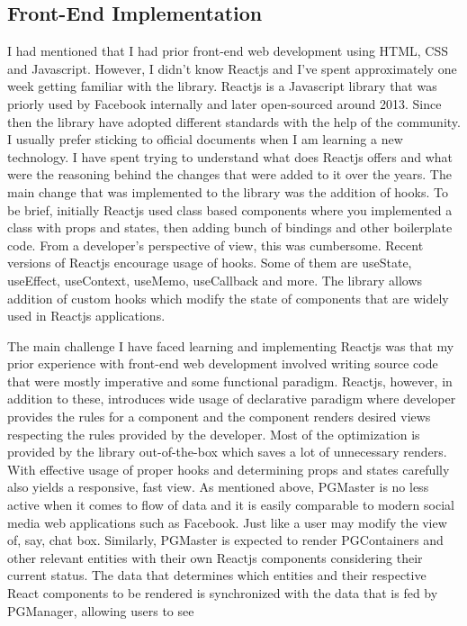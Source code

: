 \subsection{Front-End Implementation}
I had mentioned that I had prior front-end web development using HTML, CSS and 
Javascript. However, I didn't know Reactjs and I've spent approximately one 
week getting familiar with the library. Reactjs is a Javascript library 
that was priorly used by Facebook internally and later open-sourced around 
2013. Since then the library have adopted different standards with the help 
of the community. I usually prefer sticking to official documents when I 
am learning a new technology. I have spent trying to understand what does 
Reactjs offers and what were the reasoning behind the changes that were 
added to it over the years. The main change that was implemented to the 
library was the addition of hooks. To be brief, initially Reactjs used 
class based components where you implemented a class with props and states, 
then adding bunch of bindings and other boilerplate code. From a developer's 
perspective of view, this was cumbersome. Recent versions of Reactjs 
encourage usage of hooks. Some of them are useState, useEffect, useContext,
useMemo, useCallback and more. The library allows addition of custom hooks 
which modify the state of components that are widely used in Reactjs 
applications.
\par
The main challenge I have faced learning and implementing Reactjs was that 
my prior experience with front-end web development involved writing source 
code that were mostly imperative and some functional paradigm. Reactjs, 
however, in addition to these, introduces wide usage of declarative paradigm 
where developer provides the rules for a component and the component renders 
desired views respecting the rules provided by the developer. Most of the 
optimization is provided by the library out-of-the-box which saves a lot of 
unnecessary renders. With effective usage of proper hooks and determining 
props and states carefully also yields a responsive, fast view. As mentioned 
above, PGMaster is no less active when it comes to flow of data and it is 
easily comparable to modern social media web applications such as Facebook. 
Just like a user may modify the view of, say, chat box. Similarly, PGMaster 
is expected to render PGContainers and other relevant entities with their own 
Reactjs components considering their current status. The data that determines 
which entities and their respective React components to be rendered is 
synchronized with the data that is fed by PGManager, allowing users to see 
